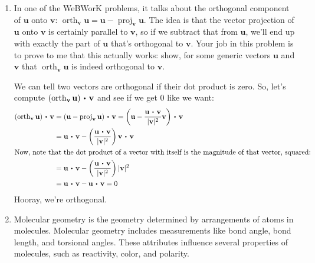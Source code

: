 \documentclass[10pt]{article}
\newcommand{\vu}{\mathbf{u}}
\newcommand{\vv}{\mathbf{v}}
\newcommand{\orth}{\operatorname{orth}}
\newcommand{\proj}{\operatorname{proj}}
\newcommand\dotp[1][.5]{\,\mathbin{\vcenter{\hbox{\scalebox{#1}{$\bullet$}}}}\,}
\newenvironment{red}{\color{red}}{\ignorespacesafterend}
\begin{document}
\begin{enumerate}[leftmargin=0pt]
    \item In one of the WeBWorK problems, it talks about the orthogonal component of $\vu$ onto $\vv$:
		$\orth_\vv \vu = \vu - \proj_\vv \vu$.
		The idea is that the vector projection of $\vu$ onto $\vv$ is certainly parallel to $\vv$, so if we subtract that from $\vu$, we'll end up with exactly the part of $\vu$ that's orthogonal to $\vv$. Your job in this problem is to prove to me that this actually works: show, for some generic vectors $\vu$ and $\vv$ that $\orth_\vv \vu$ is indeed orthogonal to $\vv$.
		
		\begin{red}
			We can tell two vectors are orthogonal if their dot product is zero. So, let's compute $(\orth_\vv \vu) \dotp \vv$ and see if we get $0$ like we want:
			\begin{align*}
				(\orth_\vv \vu) \dotp \vv &= (\vu - \proj_\vv \vu) \dotp \vv 
				= \left(\vu - \frac{\vu\dotp\vv}{|\vv|^2}\vv \right) \dotp \vv \\
				&= \vu \dotp \vv - \left(\frac{\vu\dotp\vv}{|\vv|^2}\right)\vv\dotp\vv \\
				\intertext{Now, note that the dot product of a vector with itself is the magnitude of that vector, squared:}
				&= \vu \dotp \vv - \left(\frac{\vu\dotp\vv}{|\vv|^2}\right)|\vv|^2\\
				&= \vu \dotp \vv - \vu \dotp \vv = 0
			\end{align*}
			Hooray, we're orthogonal.
		\end{red}
	\item 
    \begin{minipage}[t]{0.5\linewidth}
    Molecular geometry is the geometry determined by arrangements of atoms in molecules. Molecular geometry includes measurements like bond angle, bond length, and torsional angles. These attributes influence several properties of molecules, such as reactivity, color, and polarity.
    

\end{minipage}
\end{enumerate}
\end{document}
